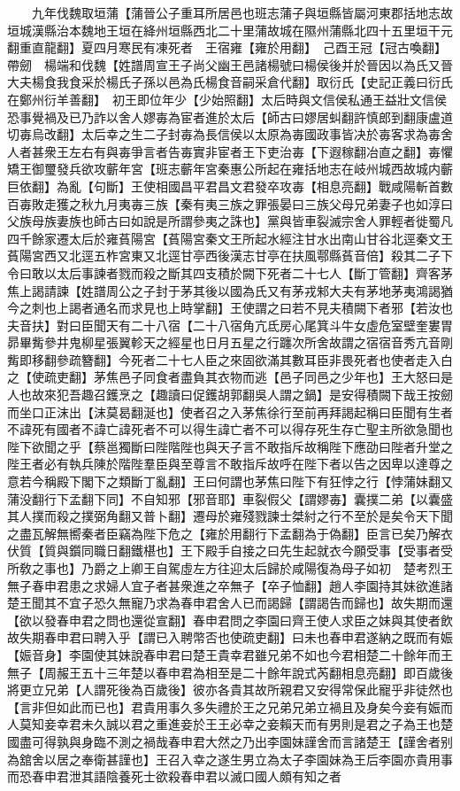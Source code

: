 　　九年伐魏取垣蒲【蒲晉公子重耳所居邑也班志蒲子與垣縣皆屬河東郡括地志故垣城漢縣治本魏地王垣在絳州垣縣西北二十里蒲故城在隰州蒲縣北四十五里垣干元翻重直龍翻】夏四月寒民有凍死者　王宿雍【雍於用翻】　己酉王冠【冠古喚翻】帶劒　楊端和伐魏【姓譜周宣王子尚父幽王邑諸楊號曰楊侯後并於晉因以為氏又晉大夫楊食我食采於楊氏子孫以邑為氏楊食音嗣采倉代翻】取衍氏【史記正義曰衍氏在鄭州衍羊善翻】　初王即位年少【少始照翻】太后時與文信侯私通王益壯文信侯恐事覺禍及已乃詐以舍人嫪毐為宦者進於太后【師古曰嫪居虯翻許慎郎到翻康盧道切毐烏改翻】太后幸之生二子封毐為長信侯以太原為毐國政事皆决於毐客求為毐舍人者甚衆王左右有與毐爭言者告毐實非宦者王下吏治毐【下遐稼翻冶直之翻】毐懼矯王御璽發兵欲攻蘄年宮【班志蘄年宮秦惠公所起在雍括地志在岐州城西故城内蘄巨依翻】為亂【句斷】王使相國昌平君昌文君發卒攻毐【相息亮翻】戰咸陽斬首數百毐敗走獲之秋九月夷毐三族【秦有夷三族之罪張晏曰三族父母兄弟妻子也如淳曰父族母族妻族也師古曰如說是所謂參夷之誅也】黨與皆車裂滅宗舍人罪輕者徙蜀凡四千餘家遷太后於雍萯陽宮【萯陽宮秦文王所起水經注甘水出南山甘谷北逕秦文王萯陽宮西又北逕五柞宮東又北逕甘亭西後漢志甘亭在扶風鄠縣萯音倍】殺其二子下令曰敢以太后事諫者戮而殺之斷其四支積於闕下死者二十七人【斷丁管翻】齊客茅焦上謁請諫【姓譜周公之子封于茅其後以國為氏又有茅戎邾大夫有茅地茅夷鴻謁猶今之刺也上謁者通名而求見也上時掌翻】王使謂之曰若不見夫積闕下者邪【若汝也夫音扶】對曰臣聞天有二十八宿【二十八宿角亢氐房心尾箕斗牛女虛危室壁奎婁胃昴畢觜參井鬼柳星張翼軫天之經星也日月五星之行躔次所舍故謂之宿宿音秀亢音剛觜即移翻參疏簪翻】今死者二十七人臣之來固欲滿其數耳臣非畏死者也使者走入白之【使疏吏翻】茅焦邑子同食者盡負其衣物而逃【邑子同邑之少年也】王大怒曰是人也故來犯吾趣召鑊烹之【趣讀曰促鑊胡郭翻吳人謂之鍋】是安得積闕下哉王按劒而坐口正沫出【沫莫曷翻涎也】使者召之入茅焦徐行至前再拜謁起稱曰臣聞有生者不諱死有國者不諱亡諱死者不可以得生諱亡者不可以得存死生存亡聖主所欲急聞也陛下欲聞之乎【蔡邕獨斷曰陛階陛也與天子言不敢指斥故稱陛下應劭曰陛者升堂之陛王者必有執兵陳於階陛羣臣與至尊言不敢指斥故呼在陛下者以告之因卑以達尊之意若今稱殿下閣下之類斷丁亂翻】王曰何謂也茅焦曰陛下有狂悖之行【悖蒲妹翻又蒲没翻行下孟翻下同】不自知邪【邪音耶】車裂假父【謂嫪毐】囊撲二弟【以囊盛其人撲而殺之撲弼角翻又普卜翻】遷母於雍殘戮諫士桀紂之行不至於是矣令天下聞之盡瓦解無嚮秦者臣竊為陛下危之【雍於用翻行下孟翻為于偽翻】臣言已矣乃解衣伏質【質與鑕同職日翻鐵椹也】王下殿手自接之曰先生起就衣今願受事【受事者受所敎之事也】乃爵之上卿王自駕虛左方往迎太后歸於咸陽復為母子如初　楚考烈王無子春申君患之求婦人宜子者甚衆進之卒無子【卒子恤翻】趙人李園持其妹欲進諸楚王聞其不宜子恐久無寵乃求為春申君舍人已而謁歸【謂謁告而歸也】故失期而還【欲以發春申君之問也還從宣翻】春申君問之李園曰齊王使人求臣之妹與其使者飲故失期春申君曰聘入乎【謂已入聘幣否也使疏吏翻】曰未也春申君遂納之既而有娠【娠音身】李園使其妹說春申君曰楚王貴幸君雖兄弟不如也今君相楚二十餘年而王無子【周赧王五十三年楚以春申君為相至是二十餘年說式芮翻相息亮翻】即百歲後將更立兄弟【人謂死後為百歲後】彼亦各貴其故所親君又安得常保此寵乎非徒然也【言非但如此而已也】君貴用事久多失禮於王之兄弟兄弟立禍且及身矣今妾有娠而人莫知妾幸君未久誠以君之重進妾於王王必幸之妾賴天而有男則是君之子為王也楚國盡可得孰與身臨不測之禍哉春申君大然之乃出李園妹謹舍而言諸楚王【謹舍者别為舘舍以居之奉衛甚謹也】王召入幸之遂生男立為太子李園妹為王后李園亦貴用事而恐春申君泄其語陰養死士欲殺春申君以滅口國人頗有知之者